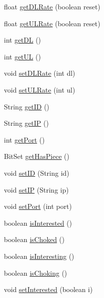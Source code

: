 \begin{DoxyCompactItemize}
\item 
float \hyperlink{classj_bittorrent_a_p_i_1_1_peer_a79fe669ebeaec347570b4f9acbcc73e9}{getDLRate} (boolean reset)
\item 
float \hyperlink{classj_bittorrent_a_p_i_1_1_peer_a3a73a98b5bed923f31a60ea06bec9d58}{getULRate} (boolean reset)
\item 
int \hyperlink{classj_bittorrent_a_p_i_1_1_peer_a4a3d9c05c162843efcf946b7b751d217}{getDL} ()
\item 
int \hyperlink{classj_bittorrent_a_p_i_1_1_peer_a7e728ed4c9f505509669eec249ff4728}{getUL} ()
\item 
void \hyperlink{classj_bittorrent_a_p_i_1_1_peer_ab7e729e31a066939ffe067dbe6f5c7f0}{setDLRate} (int dl)
\item 
void \hyperlink{classj_bittorrent_a_p_i_1_1_peer_af0348eb2b8fb4cffa99f96777ea8d7cb}{setULRate} (int ul)
\item 
String \hyperlink{classj_bittorrent_a_p_i_1_1_peer_a3c000bc04c36f38849de8f24c1c1ca4b}{getID} ()
\item 
String \hyperlink{classj_bittorrent_a_p_i_1_1_peer_a45433671f97727829f59f7f215fd04ec}{getIP} ()
\item 
int \hyperlink{classj_bittorrent_a_p_i_1_1_peer_a8d9e796f58c6c0083ff7336986af72f6}{getPort} ()
\item 
BitSet \hyperlink{classj_bittorrent_a_p_i_1_1_peer_a8161bb02d7e8a626606fc1f48720167e}{getHasPiece} ()
\item 
void \hyperlink{classj_bittorrent_a_p_i_1_1_peer_a3c44feb22505911dd1d168386c230918}{setID} (String id)
\item 
void \hyperlink{classj_bittorrent_a_p_i_1_1_peer_a765f94ac876c1de0d22ec44cbadaa5ef}{setIP} (String ip)
\item 
void \hyperlink{classj_bittorrent_a_p_i_1_1_peer_ac15e5b181addfb991805605b9549859f}{setPort} (int port)
\item 
boolean \hyperlink{classj_bittorrent_a_p_i_1_1_peer_af294901b95599c05a7b11697e1881252}{isInterested} ()
\item 
boolean \hyperlink{classj_bittorrent_a_p_i_1_1_peer_aed29d428f718b3547a91a1fc5008d1df}{isChoked} ()
\item 
boolean \hyperlink{classj_bittorrent_a_p_i_1_1_peer_a1f8c763eaf3f5b037a90fd71cb2db123}{isInteresting} ()
\item 
boolean \hyperlink{classj_bittorrent_a_p_i_1_1_peer_a14f019b3986a9b45c8f9464118ff994d}{isChoking} ()
\item 
void \hyperlink{classj_bittorrent_a_p_i_1_1_peer_aff5f908b9c7a9d252310619bb47d9148}{setInterested} (boolean i)

\end{DoxyCompactItemize}
